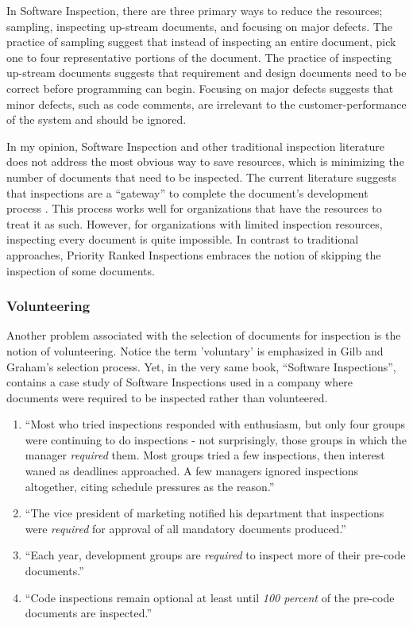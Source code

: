 In Software Inspection, there are three primary ways to reduce the
resources; sampling, inspecting up-stream documents, and focusing on major
defects. The practice of sampling suggest that instead of inspecting an
entire document, pick one to four representative portions of the document.
The practice of inspecting up-stream documents suggests that requirement
and design documents need to be correct before programming can begin.
Focusing on major defects suggests that minor defects, such as code
comments, are irrelevant to the customer-performance of the system and
should be ignored.

In my opinion, Software Inspection and other traditional inspection
literature does not address the most obvious way to save resources, which
is minimizing the number of documents that need to be inspected. The
current literature suggests that inspections are a ``gateway'' to complete
the document's development process \cite{Ebenau94, Wiegers98}. This process
works well for organizations that have the resources to treat it as such.
However, for organizations with limited inspection resources, inspecting
every document is quite impossible. In contrast to traditional approaches,
Priority Ranked Inspections embraces the notion of skipping the inspection
of some documents.

\subsubsection{Volunteering}
Another problem associated with the selection of documents for inspection
is the notion of volunteering. Notice the term 'voluntary' is emphasized in
Gilb and Graham's selection process. Yet, in the very same book, ``Software
Inspections'', contains a case study of Software Inspections used in a
company where documents were required to be inspected rather than
volunteered.

\begin{enumerate}
\item ``Most who tried inspections responded with enthusiasm, but only four
  groups were continuing to do inspections - not surprisingly, those groups
  in which the manager \emph{required} them. Most groups tried a few
  inspections, then interest waned as deadlines approached. A few managers
  ignored inspections altogether, citing schedule pressures as the
  reason.''
\item ``The vice president of marketing notified his department that
  inspections were \emph{required} for approval of all mandatory documents
  produced.''
\item ``Each year, development groups are \emph{required} to inspect
  more of their pre-code documents.''
\item ``Code inspections remain optional at least until \emph{100 percent}
  of the pre-code documents are inspected.''
\end{enumerate}

